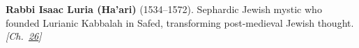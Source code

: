 \textbf{Rabbi Isaac Luria (Ha'ari)} (1534–1572). Sephardic Jewish mystic who founded Lurianic Kabbalah in Safed, transforming post-medieval Jewish thought. \emph{[Ch.~\hyperref[ch:jewishcalendar]{26}]}


